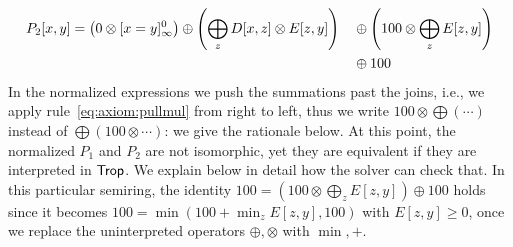 \begin{ex}[APSP100]
{\begin{alignat*}{2}
  P_{2}[x,y] %
             & = \left(0 \otimes \totrop{x=y}\right) \oplus \left(\bigoplus_{z} D[x,z] \otimes E[z,y]\right) && \oplus \left(100 \otimes\bigoplus_{z} E[z,y]\right) \\
             &&& \oplus 100
\end{alignat*}
}
%
In the normalized expressions we push the summations past the joins,
i.e., we apply rule~\eqref{eq:axiom:pullmul} from right to left, thus
we write $100 \otimes \bigoplus (\cdots)$ instead of
$\bigoplus (100 \otimes \cdots)$: we give the rationale below.  At
this point, the normalized $P_{1}$ and $P_{2}$ are not isomorphic, yet
they are equivalent if they are interpreted in $\text{\sf Trop}$.
We explain below in detail how the solver can check that.
In this particular semiring,
the
identity
$
  100 = \left(100 \otimes \bigoplus_{z} E[z,y]\right)  \oplus 100
$
holds since it becomes
$
100 = \min(100 + \min_{z} E[z,y],100)
$
with $E[z,y] \geq 0$,
once we replace the uninterpreted operators
$\oplus, \otimes$ with $\min, +$.
%
\end{ex}


